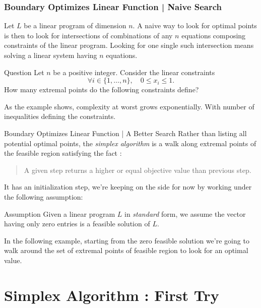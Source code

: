 \documentclass[aspectratio = 169]{beamer}
\begin{document}
\begin{frame}
  \frametitle{Boundary Optimizes Linear Function | Naive Search}
  Let $L$ be a linear program of dimension $n$. A naive way to look
  for optimal points is then to look for intersections of combinations
  of any $n$ equations composing constraints of the linear
  program. \pause Looking for one single such intersection means
  solving a linear system having $n$ equations.
  \pause
  \begin{halfshyblock}{Question}
    Let $n$ be a positive integer. Consider the linear constraints
    \[
    \forall i \in \{1, \ldots, n\}, \quad 0 \leq x_i \leq 1.
    \]
    How many extremal points do the following constraints define?
  \end{halfshyblock}
  \pause
  As the example shows, complexity at worst grows exponentially. With
  number of inequalities defining the constraints.
\end{frame}

\begin{frame}{Boundary Optimizes Linear Function | A Better Search}
  Rather than listing all potential optimal points, the \emph{simplex
    algorithm} is a walk along extremal points of the feasible region
  satisfying the fact :
  \begin{quotation}
    A given step returns a higher or equal objective value than
    previous step.
  \end{quotation}
  It has an initialization step, we're keeping on the side for
  now by working under the following assumption:
  \begin{alertblock}{Assumption}
    Given a linear program $L$ in \textit{standard} form, we assume
    the vector having only zero entries is a feasible solution of $L$.
  \end{alertblock}
  \pause
  In the following example, starting from the zero feasible
  solution we're going to walk around the set of extremal points of
  feasible region to look for an optimal value.
\end{frame}

\section{Simplex Algorithm : First Try}
\end{document}
